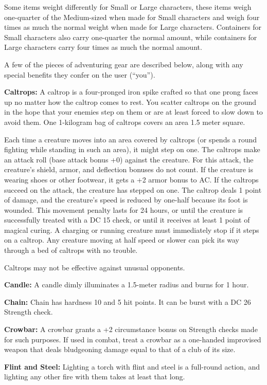Some items weight differently for Small or Large characters, these items weigh one-quarter of the Medium-sized when made for Small characters and weigh four times as much the normal weight when made for Large characters. Containers for Small characters also carry one-quarter the normal amount, while containers for Large characters carry four times as much the normal amount.

A few of the pieces of adventuring gear are described below, along with any special benefits they confer on the user (``you'').


\textbf{Caltrops:} A caltrop is a four-pronged iron spike crafted so that one prong faces up no matter how the caltrop comes to rest. You scatter caltrops on the ground in the hope that your enemies step on them or are at least forced to slow down to avoid them. One 1-kilogram bag of caltrops covers an area 1.5 meter square.

Each time a creature moves into an area covered by caltrops (or spends a round fighting while standing in such an area), it might step on one. The caltrops make an attack roll (base attack bonus +0) against the creature. For this attack, the creature's shield, armor, and deflection bonuses do not count. If the creature is wearing shoes or other footwear, it gets a +2 armor bonus to AC. If the caltrops succeed on the attack, the creature has stepped on one. The caltrop deals 1 point of damage, and the creature's speed is reduced by one-half because its foot is wounded. This movement penalty lasts for 24 hours, or until the creature is successfully treated with a DC 15  check, or until it receives at least 1 point of magical curing. A charging or running creature must immediately stop if it steps on a caltrop. Any creature moving at half speed or slower can pick its way through a bed of caltrops with no trouble.

Caltrops may not be effective against unusual opponents.

\textbf{Candle:} A candle dimly illuminates a 1.5-meter radius and burns for 1 hour.

\textbf{Chain:} Chain has hardness 10 and 5 hit points. It can be burst with a DC 26 Strength check.

\textbf{Crowbar:} A crowbar grants a +2 circumstance bonus on Strength checks made for such purposes. If used in combat, treat a crowbar as a one-handed improvised weapon that deals bludgeoning damage equal to that of a club of its size.

\textbf{Flint and Steel:} Lighting a torch with flint and steel is a full-round action, and lighting any other fire with them takes at least that long.

